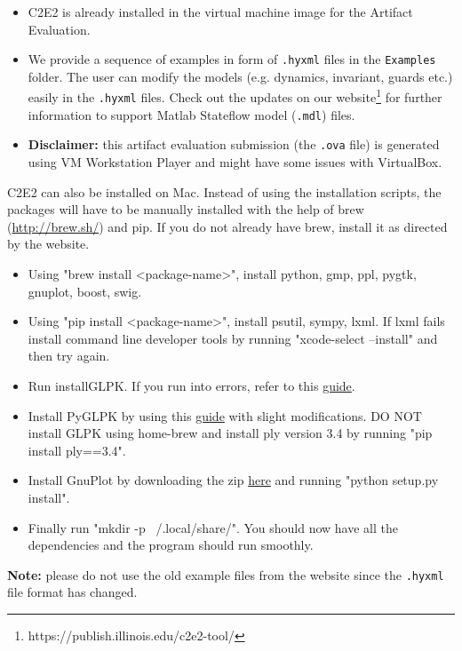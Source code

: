 \documentclass{tufte-book} %
\begin{document}
\begin{itemize}
\item C2E2 is already installed in the virtual machine image for the Artifact Evaluation.
\item We provide a sequence of examples in form of \texttt{.hyxml} files in the \texttt{Examples} folder. The user can modify the models (e.g. dynamics, invariant, guards etc.) easily in the \texttt{.hyxml} files. Check out the updates on our website\footnote{https://publish.illinois.edu/c2e2-tool/} for further information to support Matlab Stateflow model (\texttt{.mdl}) files.
\item {\bf Disclaimer:} this artifact evaluation submission (the \texttt{.ova} file) is generated using VM Workstation Player and might have some issues with VirtualBox.
\end{itemize}

C2E2 can also be installed on Mac. Instead of using the installation scripts, the packages will have to be manually installed with the help of brew (\url{http://brew.sh/}) and pip. If you do not already have brew, install it as directed by the website.
\begin{itemize}
\item Using "brew install <package-name>", install python, gmp, ppl, pygtk, gnuplot, boost, swig.
\item Using "pip install <package-name>", install psutil, sympy, lxml. If lxml fails install command line developer tools by running "xcode-select --install" and then try again.
\item Run installGLPK. If you run into errors, refer to this \href{http://hichenwang.blogspot.com/2011/08/fw-installing-glpk-on-mac.html}{guide}.
\item Install PyGLPK by using this \href{http://blog.ducky.io/python/2013/07/01/Installing-Python-glpk}{guide} with slight modifications. DO NOT install GLPK using home-brew and install ply version 3.4 by running "pip install ply==3.4".
\item Install GnuPlot by downloading the zip \href{http://gnuplot-py.sourceforge.net/}{here} and running "python setup.py install".
\item Finally run "mkdir -p ~/.local/share/". You should now have all the dependencies and the program should run smoothly.
\end{itemize}

{\bf Note: \/} please do not use the old example files from the website since the \texttt{.hyxml} file format has changed.
\end{document}
